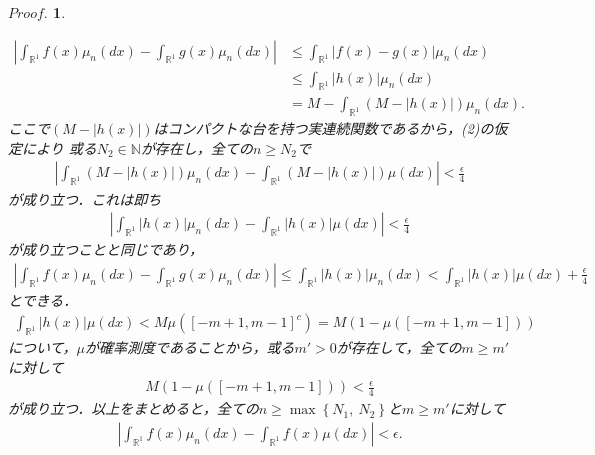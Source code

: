 \documentclass[a4j,papersize,disablejfam,slide,14pt]{jsarticle}
\newtheorem{Proof}{$Proof.$}
\def\max#1#2{\operatorname{max} \left\{ #1,\ #2 \right\}} %
\begin{document}
\begin{Proof}
\begin{description}
                \begin{align}
                	\left| \int_{\mathbb{R}^1} f(x)\mu_n(dx) - \int_{\mathbb{R}^1} g(x)\mu_n(dx) \right| 
                    &\leq \int_{\mathbb{R}^1} \left| f(x) - g(x) \right| \mu_n(dx) \\
                    &\leq \int_{\mathbb{R}^1} \left| h(x) \right| \mu_n(dx) \\
                    &= M - \int_{\mathbb{R}^1} (M - \left| h(x) \right|) \mu_n(dx).
                \end{align}
                ここで$(M - \left| h(x) \right|)$はコンパクトな台を持つ実連続関数であるから，(2)の仮定により
                或る$N_2 \in \mathbb{N}$が存在し，全ての$n \geq N_2$で
                \begin{align}
                	\left| \int_{\mathbb{R}^1} (M - \left| h(x) \right|) \mu_n(dx) - \int_{\mathbb{R}^1} (M - \left| h(x) \right|) \mu(dx) \right| < \frac{\epsilon}{4}
                \end{align}
                が成り立つ．これは即ち
                \begin{align}
                	\left| \int_{\mathbb{R}^1} \left| h(x) \right| \mu_n(dx) - \int_{\mathbb{R}^1} \left| h(x) \right| \mu(dx) \right| < \frac{\epsilon}{4}
                \end{align}
                が成り立つことと同じであり，
                \begin{align}
                	\left| \int_{\mathbb{R}^1} f(x)\mu_n(dx) - \int_{\mathbb{R}^1} g(x)\mu_n(dx) \right| 
                    \leq \int_{\mathbb{R}^1} \left| h(x) \right| \mu_n(dx)
                    < \int_{\mathbb{R}^1} \left| h(x) \right| \mu(dx) + \frac{\epsilon}{4}
                \end{align}
                とできる．
                \begin{align}
                	\int_{\mathbb{R}^1} \left| h(x) \right| \mu(dx) < M \mu([-m+1,m-1]^c) = M (1 - \mu([-m+1,m-1]))
                \end{align}
                について，$\mu$が確率測度であることから，或る$m'>0$が存在して，全ての$m \geq m'$に対して
                \begin{align}
                	M (1 - \mu([-m+1,m-1])) < \frac{\epsilon}{4}
                \end{align}
                が成り立つ．以上をまとめると，全ての$n \geq \max{N_1}{N_2}$と$m \geq m'$に対して
                \begin{align}
                	\left| \int_{\mathbb{R}^1} f(x)\mu_n(dx) - \int_{\mathbb{R}^1} f(x)\mu(dx) \right|  < \epsilon.

\end{align}
\end{description}
\end{Proof}
\end{document}
